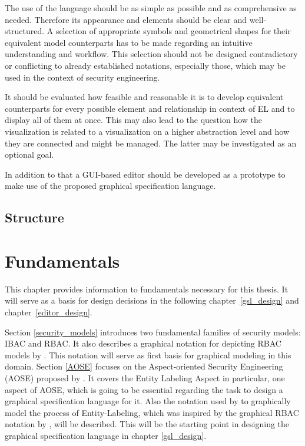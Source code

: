 \documentclass[twoside, openright, 12pt]{book}
\begin{document}
The use of the language should be as simple as possible and as comprehensive as needed.
Therefore its appearance and elements should be clear and well-structured.
A selection of appropriate symbols and geometrical shapes for their equivalent model counterparts has to be made regarding an intuitive understanding and workflow.
This selection should not be designed contradictory or conflicting to already established notations, especially those, which may be used in the context of security engineering.

It should be evaluated how feasible and reasonable it is to develop equivalent counterparts for every possible element and relationship in context of EL and to display all of them at once.
This may also lead to the question how the visualization is related to a visualization on a higher abstraction level and how they are connected and might be managed.
The latter may be investigated as an optional goal.

In addition to that a GUI-based editor should be developed as a prototype to make use of the proposed graphical specification language.



\section{Structure}
\label{structure}




\cleardoublepage
\chapter{Fundamentals}
\label{fundamentals}
This chapter provides information to fundamentals necessary for this thesis.
It will serve as a basis for design decisions in the following chapter~\ref{gsl_design} and chapter~\ref{editor_design}.

Section \ref{security_models} introduces two fundamental families of security models: IBAC and RBAC.
It also describes a graphical notation for depicting RBAC models by \cite{Sandhu96}.
This notation will serve as first basis for graphical modeling in this domain.
Section \ref{AOSE} focuses on the Aspect-oriented Security Engineering (AOSE) proposed by \citet*{Amthor18}.
It covers the Entity Labeling Aspect in particular, one aspect of AOSE, which is going to be essential regarding the task to design a graphical specification language for it.
Also the notation used by \citet*{Amthor18} to graphically model the process of Entity-Labeling, which was inspired by the graphical RBAC notation by \cite{Sandhu96}, will be described.
This will be the starting point in designing the graphical specification language in chapter \ref{gsl_design}.
\end{document}
